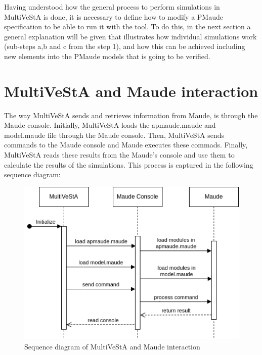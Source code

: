 Having understood how the general process to perform simulations in MultiVeStA is done, it is necessary to define how to modify a PMaude specification to be able to run it with the tool. To do this, in the next section a general explanation will be given that illustrates how individual simulations work (sub-steps a,b and c from the step 1), and how this can be achieved including new elements into the PMaude models that is going to be verified.

\section{MultiVeStA and Maude interaction}
The way MultiVeStA sends and retrieves information from Maude, is through the Maude console. Initially, MultiVeStA loads the apmaude.maude and model.maude file through the Maude console. Then, MultiVeStA sends commands to the Maude console and Maude executes these commads. Finally, MultiVeStA reads these results from the Maude's console and use them to calculate the results of the simulations. This process is captured in the following sequence diagram:

\begin{figure}[H]
    \centering
    \includegraphics[scale = 0.6]{images/multi4.png}
    \caption{Sequence diagram of MultiVeStA and Maude interaction}
    \label{fig:multi4}
\end{figure}

